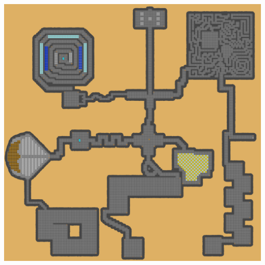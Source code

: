 \documentclass[a4paper, landscape]{article}
\begin{document}
\begin{multicols}{2}
\includegraphics[trim = 2294 0 2283 4522, clip, height = 19cm, width = 14cm]{Dungeon_playersmap.png}
	\end{multicols}
\clearpage
\end{document}
